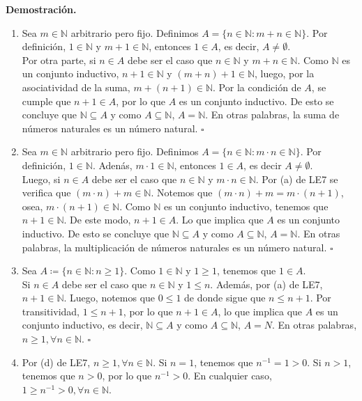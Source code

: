 \documentclass[11pt]{article}
\newcommand{\N}{\mathbb{N}}
\begin{document}
\textbf{Demostración.}

\begin{enumerate}[label=\alph*)]
    \item Sea $m\in \N$ arbitrario pero fijo. Definimos $A=\{ n\in \N : m+n \in \N \}$. Por definición, $1\in \N$ y $m+1\in \N$, entonces $1\in A$, es decir, $A\neq \emptyset$. \\[5pt] Por otra parte, si $n\in A$ debe ser el caso que $n\in \N$ y $m+n\in \N$. Como $\N$ es un conjunto inductivo, $n+1 \in \N$ y $(m+n)+1 \in \N$, luego, por la asociatividad de la suma, $m+(n+1)\in \N$. Por la condición de $A$, se cumple que $n+1\in A$, por lo que $A$ es un conjunto inductivo. De esto se concluye que $\N\subseteq A$ y como $A\subseteq \N$, $A=\N$. En otras palabras, la suma de números naturales es un número natural. \mbox{}\hfill $\square$
    
    \item Sea $m\in \N$ arbitrario pero fijo. Definimos $A=\{n\in \N: m\cdot n \in \N\}$. Por definición, $1 \in \N$. Adenás, $m\cdot 1 \in \N$, entonces $1 \in A$, es decir $A \neq \emptyset$.\\[5pt] 
    Luego, si $n \in A$ debe ser el caso que $n\in \N$ y $m \cdot n \in \N$. Por (a) de LE7 se verifica que $(m \cdot n) + m \in \N$. Notemos que $(m \cdot n) + m=m \cdot (n+1)$, osea, $m \cdot (n+1) \in \N$. Como $\N$ es un conjunto inductivo, tenemos que $n+1\in \N$. De este modo, $n+1\in A$. Lo que implica que $A$ es un conjunto inductivo. De esto se concluye que $\N \subseteq A$ y como $A\subseteq \N$, $A=\N$. En otras palabras, la multiplicación de números naturales es un número natural. \mbox{}\hfill $\square$

    \item Sea $A\coloneqq \{n\in \N: n\geq 1\}$. Como $1\in \N$ y $1\geq 1$, tenemos que $1\in A$.\\[5pt]
    Si $n\in A$ debe ser el caso que $n\in \N$ y $1\leq n$. Además, por (a) de LE7, $n+1\in \N$. Luego, notemos que $0 \leq 1$ de donde sigue que $n \leq n+1$. Por transitividad, $1\leq n+1$, por lo que $n+1\in A$, lo que implica que $A$ es un conjunto inductivo, es decir, $\N\subseteq A$ y como $A\subseteq \N$, $A=N$. En otras palabras, $n\geq 1, \forall n\in\N$. \mbox{}\hfill $\square$

    \item Por (d) de LE7, $n\geq 1, \forall n\in \N$. Si $n=1$, tenemos que $n^{-1}=1>0$. Si $n>1$, tenemos que $n>0$, por lo que $n^{-1}>0$. En cualquier caso, $1\geq n^{-1}>0, \forall n\in \N$.


\end{enumerate}
\end{document}
